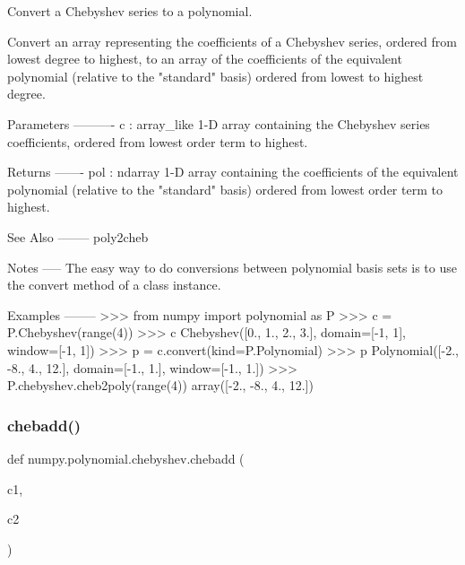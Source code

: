 \begin{DoxyVerb}Convert a Chebyshev series to a polynomial.

Convert an array representing the coefficients of a Chebyshev series,
ordered from lowest degree to highest, to an array of the coefficients
of the equivalent polynomial (relative to the "standard" basis) ordered
from lowest to highest degree.

Parameters
----------
c : array_like
    1-D array containing the Chebyshev series coefficients, ordered
    from lowest order term to highest.

Returns
-------
pol : ndarray
    1-D array containing the coefficients of the equivalent polynomial
    (relative to the "standard" basis) ordered from lowest order term
    to highest.

See Also
--------
poly2cheb

Notes
-----
The easy way to do conversions between polynomial basis sets
is to use the convert method of a class instance.

Examples
--------
>>> from numpy import polynomial as P
>>> c = P.Chebyshev(range(4))
>>> c
Chebyshev([0., 1., 2., 3.], domain=[-1,  1], window=[-1,  1])
>>> p = c.convert(kind=P.Polynomial)
>>> p
Polynomial([-2., -8.,  4., 12.], domain=[-1.,  1.], window=[-1.,  1.])
>>> P.chebyshev.cheb2poly(range(4))
array([-2.,  -8.,   4.,  12.])\end{DoxyVerb}
 \mbox{\label{namespacenumpy_1_1polynomial_1_1chebyshev_a5e6fa2e9bad3cf1e6ad2c0adaf625adb}} 
\subsubsection{\texorpdfstring{chebadd()}{chebadd()}}
{\footnotesize\ttfamily def numpy.\+polynomial.\+chebyshev.\+chebadd (\begin{DoxyParamCaption}\item[{}]{c1,  }\item[{}]{c2 }\end{DoxyParamCaption})}

